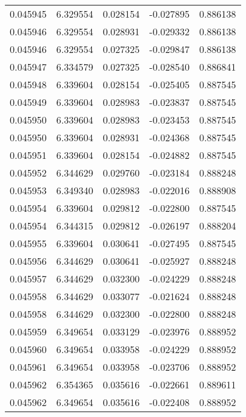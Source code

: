 \begin{tabular}{lrrrr}
0.045945    &  6.329554 &  0.028154 & -0.027895 &             0.886138 \\
0.045946    &  6.329554 &  0.028931 & -0.029332 &             0.886138 \\
0.045946    &  6.329554 &  0.027325 & -0.029847 &             0.886138 \\
0.045947    &  6.334579 &  0.027325 & -0.028540 &             0.886841 \\
0.045948    &  6.339604 &  0.028154 & -0.025405 &             0.887545 \\
0.045949    &  6.339604 &  0.028983 & -0.023837 &             0.887545 \\
0.045950    &  6.339604 &  0.028983 & -0.023453 &             0.887545 \\
0.045950    &  6.339604 &  0.028931 & -0.024368 &             0.887545 \\
0.045951    &  6.339604 &  0.028154 & -0.024882 &             0.887545 \\
0.045952    &  6.344629 &  0.029760 & -0.023184 &             0.888248 \\
0.045953    &  6.349340 &  0.028983 & -0.022016 &             0.888908 \\
0.045954    &  6.339604 &  0.029812 & -0.022800 &             0.887545 \\
0.045954    &  6.344315 &  0.029812 & -0.026197 &             0.888204 \\
0.045955    &  6.339604 &  0.030641 & -0.027495 &             0.887545 \\
0.045956    &  6.344629 &  0.030641 & -0.025927 &             0.888248 \\
0.045957    &  6.344629 &  0.032300 & -0.024229 &             0.888248 \\
0.045958    &  6.344629 &  0.033077 & -0.021624 &             0.888248 \\
0.045958    &  6.344629 &  0.032300 & -0.022800 &             0.888248 \\
0.045959    &  6.349654 &  0.033129 & -0.023976 &             0.888952 \\
0.045960    &  6.349654 &  0.033958 & -0.024229 &             0.888952 \\
0.045961    &  6.349654 &  0.033958 & -0.023706 &             0.888952 \\
0.045962    &  6.354365 &  0.035616 & -0.022661 &             0.889611 \\
0.045962    &  6.349654 &  0.035616 & -0.022408 &             0.888952 \\

\end{tabular}

